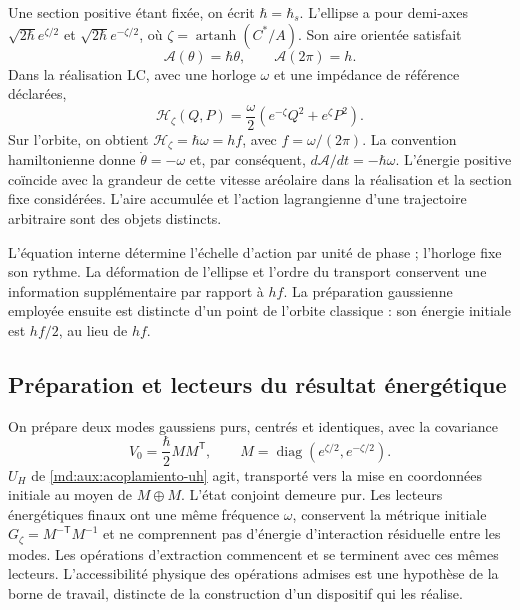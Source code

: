 Une section positive étant fixée, on écrit $\hbar=\hbar_s$.
L’ellipse a pour demi-axes $\sqrt{2\hbar}e^{\zeta/2}$ et
$\sqrt{2\hbar}e^{-\zeta/2}$, où
$\zeta=\operatorname{artanh}(C^*/A)$. Son aire orientée satisfait
\begin{equation}
 \mathcal A(\theta)=\hbar\theta,\qquad
 \mathcal A(2\pi)=h.
 \label{md:aux:area-fase}
\end{equation}
Dans la réalisation LC, avec une horloge $\omega$ et une impédance de
référence déclarées,
\begin{equation}
 \mathcal H_\zeta(Q,P)
 =\frac\omega2\left(e^{-\zeta}Q^2+e^\zeta P^2\right).
 \label{md:aux:hamiltoniano-lc}
\end{equation}
Sur l’orbite, on obtient $\mathcal H_\zeta=\hbar\omega=hf$,
avec $f=\omega/(2\pi)$. La convention hamiltonienne donne
$\dot\theta=-\omega$ et, par conséquent,
$d\mathcal A/dt=-\hbar\omega$. L’énergie positive coïncide
avec la grandeur de cette vitesse aréolaire dans la réalisation et
la section fixe considérées. L’aire accumulée et l’action
lagrangienne d’une trajectoire arbitraire sont des objets distincts.

L’équation interne détermine l’échelle d’action par unité
de phase ; l’horloge fixe son rythme. La déformation de l’ellipse
et l’ordre du transport conservent une information supplémentaire par rapport à
$hf$. La préparation gaussienne employée ensuite est distincte
d’un point de l’orbite classique : son énergie initiale est
$hf/2$, au lieu de $hf$.

\subsection{Préparation et lecteurs du résultat énergétique}
\label{md:aux:hipotesis-gaussianas}

On prépare deux modes gaussiens purs, centrés et identiques,
avec la covariance
\begin{equation}
 V_0=\frac\hbar2MM^{\mathsf T},\qquad
 M=\operatorname{diag}(e^{\zeta/2},e^{-\zeta/2}).
 \label{md:aux:preparacion}
\end{equation}
$U_H$ de \eqref{md:aux:acoplamiento-uh} agit, transporté vers
la mise en coordonnées initiale au moyen de $M\oplus M$. L’état conjoint
demeure pur. Les lecteurs énergétiques finaux ont une
même fréquence $\omega$, conservent la métrique initiale
$G_\zeta=M^{-\mathsf T}M^{-1}$ et ne comprennent pas d’énergie
d’interaction résiduelle entre les modes. Les opérations
d’extraction commencent et se terminent avec ces mêmes lecteurs.
L’accessibilité physique des opérations admises est une
hypothèse de la borne de travail, distincte de la construction
d’un dispositif qui les réalise.

